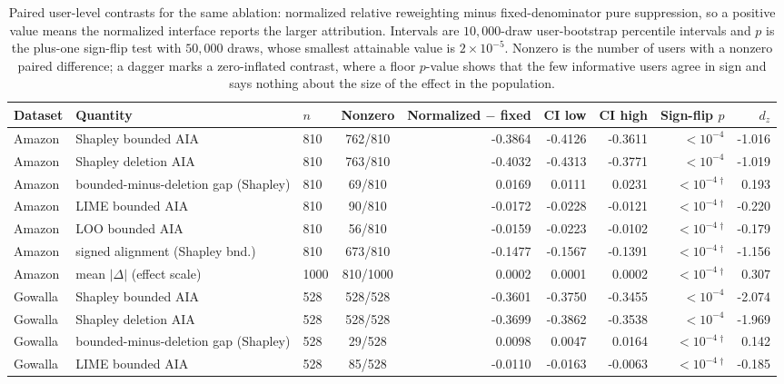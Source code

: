 \begin{table}[!htbp]\centering\scriptsize\setlength{\tabcolsep}{3pt}
\caption{Paired user-level contrasts for the same ablation: normalized relative reweighting minus fixed-denominator pure suppression, so a positive value means the normalized interface reports the larger attribution. Intervals are $10{,}000$-draw user-bootstrap percentile intervals and $p$ is the plus-one sign-flip test with $50{,}000$ draws, whose smallest attainable value is $2{\times}10^{-5}$. Nonzero is the number of users with a nonzero paired difference; a dagger marks a zero-inflated contrast, where a floor $p$-value shows that the few informative users agree in sign and says nothing about the size of the effect in the population.}
\label{tab:r9-fixed-denominator-paired}
\begin{tabular}{@{}lllcrrrrr@{}}
\toprule
Dataset & Quantity & $n$ & Nonzero & Normalized $-$ fixed & CI low & CI high & Sign-flip $p$ & $d_z$ \\
\midrule
Amazon & Shapley bounded AIA & 810 & 762/810 & -0.3864 & -0.4126 & -0.3611 & $<10^{-4}$ & -1.016 \\
Amazon & Shapley deletion AIA & 810 & 763/810 & -0.4032 & -0.4313 & -0.3771 & $<10^{-4}$ & -1.019 \\
Amazon & bounded-minus-deletion gap (Shapley) & 810 & 69/810 & 0.0169 & 0.0111 & 0.0231 & $<10^{-4}$\,$^{\dagger}$ & 0.193 \\
Amazon & LIME bounded AIA & 810 & 90/810 & -0.0172 & -0.0228 & -0.0121 & $<10^{-4}$\,$^{\dagger}$ & -0.220 \\
Amazon & LOO bounded AIA & 810 & 56/810 & -0.0159 & -0.0223 & -0.0102 & $<10^{-4}$\,$^{\dagger}$ & -0.179 \\
Amazon & signed alignment (Shapley bnd.) & 810 & 673/810 & -0.1477 & -0.1567 & -0.1391 & $<10^{-4}$\,$^{\dagger}$ & -1.156 \\
Amazon & mean $|\Delta|$ (effect scale) & 1000 & 810/1000 & 0.0002 & 0.0001 & 0.0002 & $<10^{-4}$\,$^{\dagger}$ & 0.307 \\
Gowalla & Shapley bounded AIA & 528 & 528/528 & -0.3601 & -0.3750 & -0.3455 & $<10^{-4}$ & -2.074 \\
Gowalla & Shapley deletion AIA & 528 & 528/528 & -0.3699 & -0.3862 & -0.3538 & $<10^{-4}$ & -1.969 \\
Gowalla & bounded-minus-deletion gap (Shapley) & 528 & 29/528 & 0.0098 & 0.0047 & 0.0164 & $<10^{-4}$\,$^{\dagger}$ & 0.142 \\
Gowalla & LIME bounded AIA & 528 & 85/528 & -0.0110 & -0.0163 & -0.0063 & $<10^{-4}$\,$^{\dagger}$ & -0.185 \\

\end{tabular}
\end{table}
